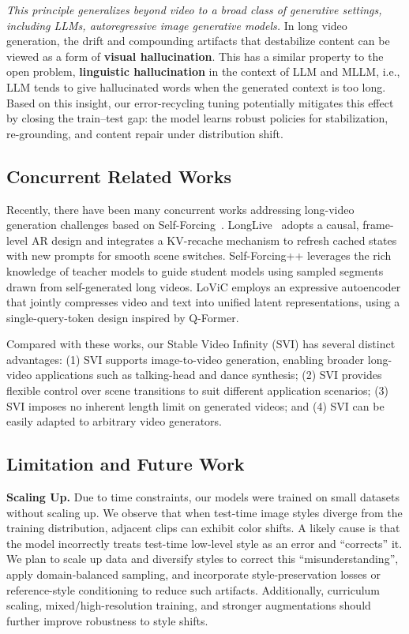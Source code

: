 \documentclass{article} %
\newcommand{\method}{Stable Video Infinity }
\newcommand{\red}[1]{{\color{red}#1}}
\begin{document}
\emph{This principle generalizes beyond video to a broad class of generative settings, including LLMs, autoregressive image generative models.} In long video generation, the drift and compounding artifacts that destabilize content can be viewed as a form of \red{\textbf{visual hallucination}}. This has a similar property to the open problem, \red{\textbf{linguistic hallucination}} in the context of LLM and MLLM, i.e., LLM tends to give hallucinated words when the generated context is too long. Based on this insight, our error-recycling tuning potentially mitigates this effect by closing the train–test gap: the model learns robust policies for stabilization, re-grounding, and content repair under distribution shift.


\subsection{Concurrent Related Works\label{appdx_related}} 

Recently, there have been many concurrent works addressing long-video generation challenges based on Self-Forcing~\citep{huang2025self}. LongLive~\citep{yang2025longlive} adopts a causal, frame-level AR design and integrates a KV-recache mechanism to refresh cached states with new prompts for smooth scene switches. Self-Forcing++\citep{cui2025self} leverages the rich knowledge of teacher models to guide student models using sampled segments drawn from self-generated long videos. LoViC\citep{jiang2025lovic} employs an expressive autoencoder that jointly compresses video and text into unified latent representations, using a single-query-token design inspired by Q-Former.

Compared with these works, our \method (SVI) has several distinct advantages: (1) SVI supports image-to-video generation, enabling broader long-video applications such as talking-head and dance synthesis; (2) SVI provides flexible control over scene transitions to suit different application scenarios; (3) SVI imposes no inherent length limit on generated videos; and (4) SVI can be easily adapted to arbitrary video generators.


\subsection{Limitation and Future Work}


\textbf{Scaling Up.} Due to time constraints, our models were trained on small datasets without scaling up. We observe that when test-time image styles diverge from the training distribution, adjacent clips can exhibit color shifts. A likely cause is that the model incorrectly treats test-time low-level style as an error and “corrects” it. We plan to scale up data and diversify styles to correct this “misunderstanding”, apply domain-balanced sampling, and incorporate style-preservation losses or reference-style conditioning to reduce such artifacts. Additionally, curriculum scaling, mixed/high-resolution training, and stronger augmentations should further improve robustness to style shifts.
\end{document}
